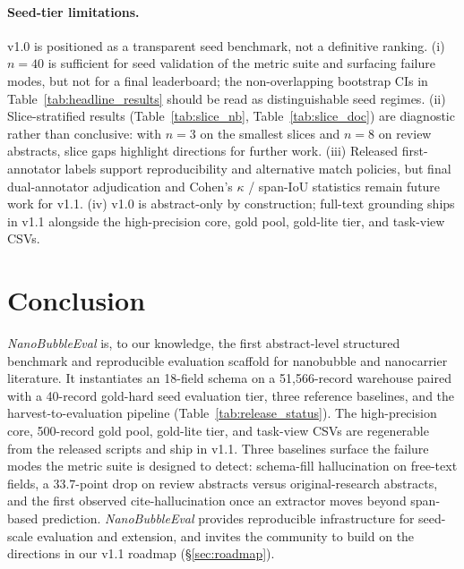 \documentclass{article}
\begin{document}
\paragraph{Seed-tier limitations.}
v1.0 is positioned as a transparent seed benchmark, not a definitive ranking. (i) $n{=}40$ is sufficient for seed validation of the metric suite and surfacing failure modes, but not for a final leaderboard; the non-overlapping bootstrap CIs in Table~\ref{tab:headline_results} should be read as distinguishable seed regimes. (ii) Slice-stratified results (Table~\ref{tab:slice_nb}, Table~\ref{tab:slice_doc}) are diagnostic rather than conclusive: with $n{=}3$ on the smallest slices and $n{=}8$ on review abstracts, slice gaps highlight directions for further work. (iii) Released first-annotator labels support reproducibility and alternative match policies, but final dual-annotator adjudication and Cohen's $\kappa$ / span-IoU statistics remain future work for v1.1. (iv) v1.0 is abstract-only by construction; full-text grounding ships in v1.1 alongside the high-precision core, gold pool, gold-lite tier, and task-view CSVs.


\section{Conclusion}
\label{sec:conclusion}

\textit{NanoBubbleEval} is, to our knowledge, the first abstract-level structured benchmark and reproducible evaluation scaffold for nanobubble and nanocarrier literature. It instantiates an 18-field schema on a 51{,}566-record warehouse paired with a 40-record gold-hard seed evaluation tier, three reference baselines, and the harvest-to-evaluation pipeline (Table~\ref{tab:release_status}). The high-precision core, 500-record gold pool, gold-lite tier, and task-view CSVs are regenerable from the released scripts and ship in v1.1. Three baselines surface the failure modes the metric suite is designed to detect: schema-fill hallucination on free-text fields, a $33.7$-point drop on review abstracts versus original-research abstracts, and the first observed cite-hallucination once an extractor moves beyond span-based prediction. \textit{NanoBubbleEval} provides reproducible infrastructure for seed-scale evaluation and extension, and invites the community to build on the directions in our v1.1 roadmap (\S\ref{sec:roadmap}).

\end{document}
